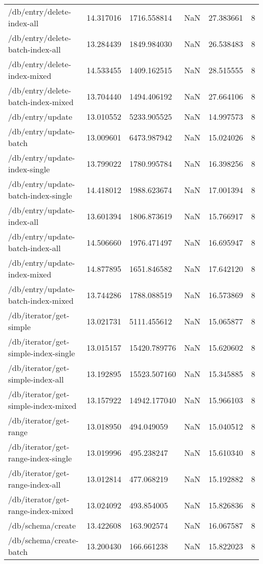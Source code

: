 \begin{tabularx}{\linewidth}{XXXXXX}
/db/entry/delete-index-all & 14.317016 & 1716.558814 & NaN & 27.383661 & 8 \\
/db/entry/delete-batch-index-all & 13.284439 & 1849.984030 & NaN & 26.538483 & 8 \\
/db/entry/delete-index-mixed & 14.533455 & 1409.162515 & NaN & 28.515555 & 8 \\
/db/entry/delete-batch-index-mixed & 13.704440 & 1494.406192 & NaN & 27.664106 & 8 \\
/db/entry/update & 13.010552 & 5233.905525 & NaN & 14.997573 & 8 \\
/db/entry/update-batch & 13.009601 & 6473.987942 & NaN & 15.024026 & 8 \\
/db/entry/update-index-single & 13.799022 & 1780.995784 & NaN & 16.398256 & 8 \\
/db/entry/update-batch-index-single & 14.418012 & 1988.623674 & NaN & 17.001394 & 8 \\
/db/entry/update-index-all & 13.601394 & 1806.873619 & NaN & 15.766917 & 8 \\
/db/entry/update-batch-index-all & 14.506660 & 1976.471497 & NaN & 16.695947 & 8 \\
/db/entry/update-index-mixed & 14.877895 & 1651.846582 & NaN & 17.642120 & 8 \\
/db/entry/update-batch-index-mixed & 13.744286 & 1788.088519 & NaN & 16.573869 & 8 \\
/db/iterator/get-simple & 13.021731 & 5111.455612 & NaN & 15.065877 & 8 \\
/db/iterator/get-simple-index-single & 13.015157 & 15420.789776 & NaN & 15.620602 & 8 \\
/db/iterator/get-simple-index-all & 13.192895 & 15523.507160 & NaN & 15.345885 & 8 \\
/db/iterator/get-simple-index-mixed & 13.157922 & 14942.177040 & NaN & 15.966103 & 8 \\
/db/iterator/get-range & 13.018950 & 494.049059 & NaN & 15.040512 & 8 \\
/db/iterator/get-range-index-single & 13.019996 & 495.238247 & NaN & 15.610340 & 8 \\
/db/iterator/get-range-index-all & 13.012814 & 477.068219 & NaN & 15.192882 & 8 \\
/db/iterator/get-range-index-mixed & 13.024092 & 493.854005 & NaN & 15.826836 & 8 \\
/db/schema/create & 13.422608 & 163.902574 & NaN & 16.067587 & 8 \\
/db/schema/create-batch & 13.200430 & 166.661238 & NaN & 15.822023 & 8 \\

\end{tabularx}
